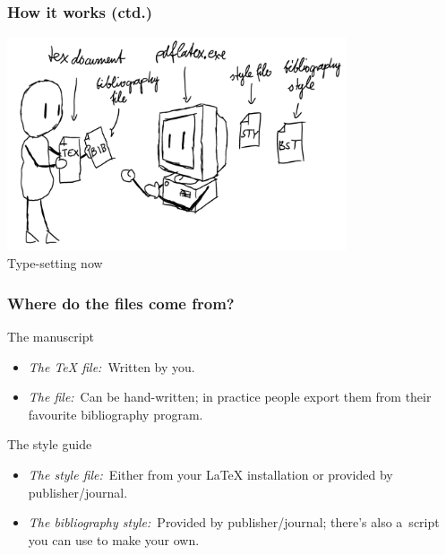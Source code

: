 \documentclass[a4paper,12pt]{beamer}
\begin{document}
\begin{frame}
  \frametitle{How it works (ctd.)}

  \begin{center}
    \includegraphics[width=0.75\textwidth]{images/typesetting-now.png}\\
    Type-setting now
  \end{center}
\end{frame}

\begin{frame}
  \frametitle{Where do the files come from?}
  
  \begin{block}{The manuscript}
    \begin{itemize}
      \item \emph{The \TeX{} file:}\ Written by you.
      \item \emph{The  file:}\ Can be hand-written; in practice
        people export them from their favourite bibliography program.
    \end{itemize}
  \end{block}
  
  \begin{block}{The style guide}
    \begin{itemize}
      \item \emph{The style file:}\ Either from your \LaTeX{} installation or
        provided by publisher/journal.
      \item \emph{The bibliography style:}\ Provided by publisher/journal;
        there's also a~script you can use to make your own.
    \end{itemize}
  \end{block}
\end{frame}
\end{document}
